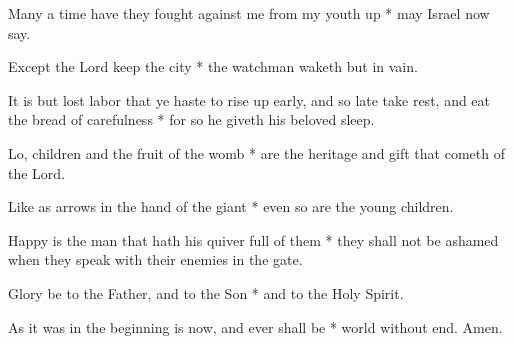 Many a time have they fought against me from my youth up * may Israel now say.

Except the Lord keep the city * the watchman waketh but in vain.

It is but lost labor that ye haste to rise up early, and so late take rest, and eat the bread of carefulness * for so he giveth his beloved sleep.

Lo, children and the fruit of the womb * are the heritage and gift that cometh of the Lord.

Like as arrows in the hand of the giant * even so are the young children.

Happy is the man that hath his quiver full of them * they shall not be ashamed when they speak with their enemies in the gate.

Glory be to the Father, and to the Son * and to the Holy Spirit.

As it was in the beginning is now, and ever shall be * world without end. Amen.